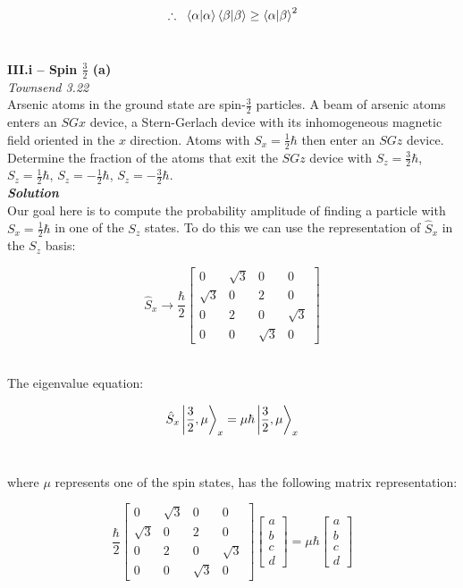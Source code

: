 \documentclass[9pt]{extarticle}
\newcommand{\bfit}[1]{\textbf{\textit{#1}}}
\begin{document}
\begin{multicols*}{2}
$$\therefore \;\; \bra{\alpha}\ket{\alpha} \bra{\beta}\ket{\beta} \geq \bra{\alpha}\ket{\beta}^2$$ \ 





\hrulefill 

\newpage


{\bf \LARGE III.i -- Spin $\frac 32$ (a)} \\ 

{\it Townsend 3.22} \\ 
Arsenic atoms in the ground state are spin-$\frac 32$ particles. A beam of arsenic atoms enters an $SGx$ device, a Stern-Gerlach device with its inhomogeneous magnetic field oriented in the $x$ direction. Atoms with $S_x = \frac 12 \hbar$ then enter an $SGz$ device. Determine the fraction of the atoms that exit the $SGz$ device with $S_z = \frac 32 \hbar$, $S_z = \frac 12 \hbar$, $S_z = -\frac 12 \hbar$, $S_z = -\frac 32 \hbar$. \\ 

{\bfit{Solution}} \\ 
Our goal here is to compute the probability amplitude of finding a particle with $S_x = \frac 12 \hbar$ in one of the $S_z$ states. To do this we can use the representation of $\hat S_x$ in the $S_z$ basis:

$$
\hat S_x \longrightarrow \frac \hbar 2
\begin{bmatrix}
        0 & \sqrt 3 & 0 & 0 \\
        \sqrt 3 & 0 & 2 & 0 \\
        0 & 2 & 0 & \sqrt 3 \\
        0 & 0 & \sqrt 3 & 0
\end{bmatrix}
$$ \

The eigenvalue equation:

$$\hat S_x \ket{\frac 32, \mu}_x = \mu \hbar \ket{\frac 32, \mu}_x$$ \ 

where $\mu$ represents one of the spin states, has the following matrix representation:

$$
\frac \hbar 2
\begin{bmatrix}
        0 & \sqrt 3 & 0 & 0 \\
        \sqrt 3 & 0 & 2 & 0 \\
        0 & 2 & 0 & \sqrt 3 \\
        0 & 0 & \sqrt 3 & 0
\end{bmatrix}
\begin{bmatrix}
	a \\ b \\ c \\ d
\end{bmatrix}
= \mu \hbar 
\begin{bmatrix}
        a \\ b \\ c \\ d
\end{bmatrix}
$$ \ 


\end{multicols*}
\end{document}
